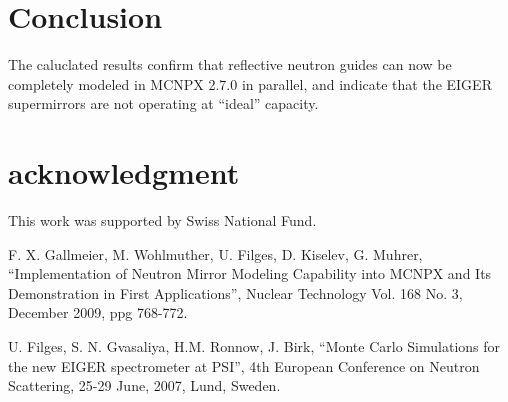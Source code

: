 \documentclass[a4paper,
              ]{jacow}
\begin{document}
\section{Conclusion}

The caluclated results confirm that reflective neutron guides can now be completely modeled in MCNPX 2.7.0 in parallel, and indicate that the EIGER supermirrors are not operating at ``ideal'' capacity.  

\section{acknowledgment}

This work was supported by Swiss National Fund.

\begin{thebibliography}{99} %

	F. X. Gallmeier, M. Wohlmuther, U. Filges, D. Kiselev, G. Muhrer,
	``Implementation of Neutron Mirror Modeling Capability into MCNPX and Its Demonstration in First Applications'',
  Nuclear Technology Vol. 168 No. 3, December 2009, ppg 768-772. 

  U. Filges, S. N. Gvasaliya, H.M. Ronnow, J. Birk,
  ``Monte Carlo Simulations for the new EIGER spectrometer at PSI'',
  4th European Conference on Neutron Scattering, 25-29 June, 2007, Lund, Sweden. \\

\end{thebibliography}
\end{document}
